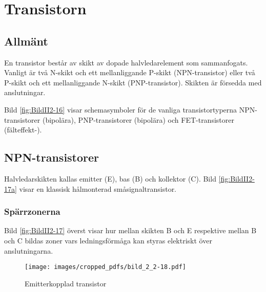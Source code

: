 \section{Transistorn}
\label{transistorn}


\subsection{Allmänt}
\label{transistor_allmänt}

En transistor består av skikt av dopade halvledarelement som sammanfogats.
Vanligt är två N-skikt och ett mellanliggande P-skikt (NPN-transistor) eller två
P-skikt och ett mellanliggande N-skikt (PNP-transistor).
Skikten är försedda med anslutningar.

Bild \ref{fig:BildII2-16} visar schemasymboler för de vanliga tran\-sistor\-typerna 
NPN-transistorer (bipolära), PNP-\-tran\-sistorer (bipolära) och
FET-transistorer (fälteffekt-).

\subsection{NPN-transistorer}

Halvledarskikten kallas emitter (E), bas (B) och kollektor (C).
Bild \ref{fig:BildII2-17a} visar en klassisk hålmonterad småsignaltransistor.



\subsubsection{Spärrzonerna}


Bild \ref{fig:BildII2-17} överst visar hur mellan skikten B och E respektive
mellan B och C bildas zoner vars ledningsförmåga kan styras elektriskt över
anslutningarna.

\begin{figure*}[p]
  \begin{center}
    \texttt{[image: images/cropped\_pdfs/bild\_2\_2-18.pdf]}
    \caption{Emitterkopplad transistor}
    \label{fig:BildII2-18}
  \end{center}
\end{figure*}

